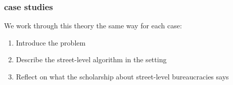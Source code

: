 \documentclass[presentation]{subfiles}
\begin{document}
\begin{frame}\frametitle{case studies}



We work through this theory the same way for each case:

\begin{enumerate}
  \item Introduce the problem
  \item Describe the street-level algorithm in the setting
  \item Reflect on what the scholarship about street-level bureaucracies says
\end{enumerate}


\end{frame}
\end{document}
